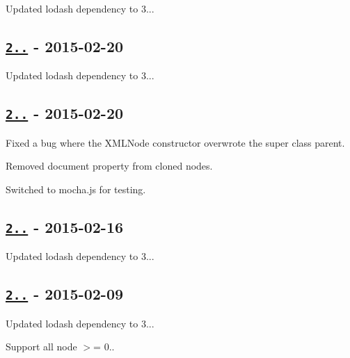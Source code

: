 \begin{DoxyItemize}
\item Updated lodash dependency to 3...
\end{DoxyItemize}

\subsection*{\href{https://github.com/oozcitak/xmlbuilder-js/compare/v2.6.0...v2.6.1}{\tt 2..} -\/ 2015-\/02-\/20}


\begin{DoxyItemize}
\item Updated lodash dependency to 3...
\end{DoxyItemize}

\subsection*{\href{https://github.com/oozcitak/xmlbuilder-js/compare/v2.5.2...v2.6.0}{\tt 2..} -\/ 2015-\/02-\/20}


\begin{DoxyItemize}
\item Fixed a bug where the {\ttfamily X\+M\+L\+Node} constructor overwrote the super class parent.
\item Removed document property from cloned nodes.
\item Switched to mocha.\+js for testing.
\end{DoxyItemize}

\subsection*{\href{https://github.com/oozcitak/xmlbuilder-js/compare/v2.5.1...v2.5.2}{\tt 2..} -\/ 2015-\/02-\/16}


\begin{DoxyItemize}
\item Updated lodash dependency to 3...
\end{DoxyItemize}

\subsection*{\href{https://github.com/oozcitak/xmlbuilder-js/compare/v2.5.0...v2.5.1}{\tt 2..} -\/ 2015-\/02-\/09}


\begin{DoxyItemize}
\item Updated lodash dependency to 3...
\item Support all node $>$= 0..
\end{DoxyItemize}

